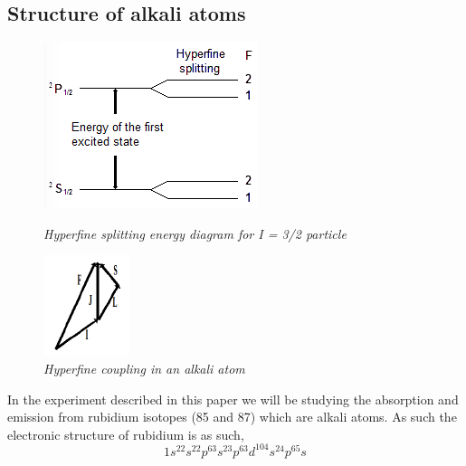 \documentclass[twocolumn]{article}
\begin{document}
\subsection{Structure of alkali atoms}
\begin{figure}
\center
\begin{minipage}{0.45\linewidth}
\includegraphics[width=\linewidth]{pictures/hyperfine-splitting.png}
\caption{\textit{Hyperfine splitting energy diagram for I = 3/2 particle
\cite{ref:3}}}
\label{fig:3}
\end{minipage}
\hfill
\begin{minipage}{0.45\linewidth}
\includegraphics[width=0.3\linewidth]{pictures/hyperfine-vectors.png}
\caption{\textit{Hyperfine coupling in an alkali atom \cite{ref:3}}}
\label{fig:4}
\end{minipage}
\end{figure}
In the experiment described in this paper we will be studying the absorption 
and emission from rubidium isotopes (85 and 87) which are alkali atoms. As such the electronic structure of rubidium is as such,
\begin{equation*}
1s^22s^22p^63s^23p^63d^104s^24p^65s
\end{equation*}
\end{document}
